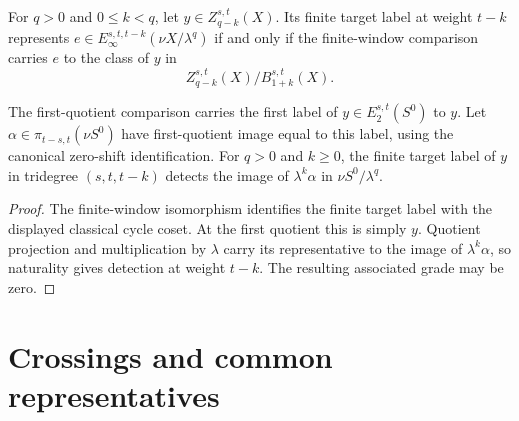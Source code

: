 \begin{theorem}
\label{sem:ProofTools:sphere-label-detection}
For $q>0$ and $0\leq k<q$, let $y\in Z_{q-k}^{s,t}(X)$. Its finite target label at weight $t-k$ represents $e\in E_\infty^{s,t,t-k}(\nu X/\lambda^q)$ if and only if the finite-window comparison carries $e$ to the class of $y$ in
\[Z_{q-k}^{s,t}(X)/B_{1+k}^{s,t}(X).\]

The first-quotient comparison carries the first label of $y\in E_2^{s,t}(S^0)$ to $y$. Let $\alpha\in\pi_{t-s,t}(\nu S^0)$ have first-quotient image equal to this label, using the canonical zero-shift identification. For $q>0$ and $k\geq0$, the finite target label of $y$ in tridegree $(s,t,t-k)$ detects the image of $\lambda^k\alpha$ in $\nu S^0/\lambda^q$.
\end{theorem}
\begin{proof}
The finite-window isomorphism identifies the finite target label with the displayed classical cycle coset. At the first quotient this is simply $y$. Quotient projection and multiplication by $\lambda$ carry its representative to the image of $\lambda^k\alpha$, so naturality gives detection at weight $t-k$. The resulting associated grade may be zero.
\end{proof}

\section{Crossings and common representatives}

